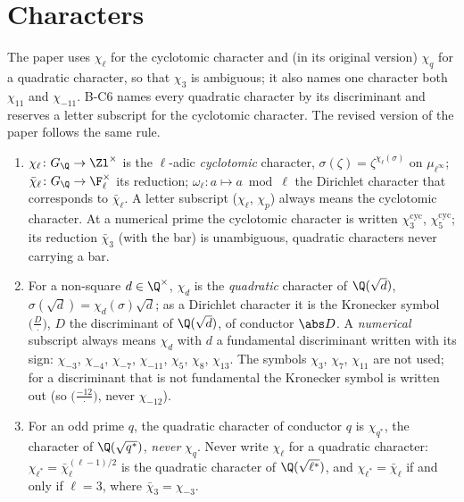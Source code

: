 \section{Characters}\label{sec:notation:characters}

The paper uses $\chi_\ell$ for the cyclotomic character and (in its original version) $\chi_q$ for a quadratic character, so
that $\chi_3$ is ambiguous; it also names one character both $\chi_{11}$ and $\chi_{-11}$. B-C6 names every quadratic character
by its discriminant and reserves a letter subscript for the cyclotomic character. The revised version of the paper follows the
same rule.

\begin{convention}[B-C6: characters]\label{conv:notation:bc6}
\leavevmode
\begin{enumerate}[label=(\alph*)]
\item $\chi_\ell\colon G_\Q\to\Zl^\times$ is the $\ell$-adic \emph{cyclotomic} character, $\sigma(\zeta)=\zeta^{\chi_\ell(\sigma)}$ on
$\mu_{\ell^\infty}$; $\bar\chi_\ell\colon G_\Q\to\F_\ell^\times$ its reduction; $\omega_\ell\colon a\mapsto a\bmod\ell$ the Dirichlet character that
corresponds to $\bar\chi_\ell$. A letter subscript ($\chi_\ell$, $\chi_p$) always means the cyclotomic character. At a numerical prime the
cyclotomic character is written $\chi_3^{\mathrm{cyc}}$, $\chi_5^{\mathrm{cyc}}$; its reduction $\bar\chi_3$ (with the bar) is unambiguous,
quadratic characters never carrying a bar.
\item For a non-square $d\in\Q^\times$, $\chi_d$ is the \emph{quadratic} character of $\Q(\sqrt d)$, $\sigma(\sqrt d)=\chi_d(\sigma)\sqrt d$; as a
Dirichlet character it is the Kronecker symbol $\bigl(\frac D\cdot\bigr)$, $D$ the discriminant of $\Q(\sqrt d)$, of conductor $\abs D$. A
\emph{numerical} subscript always means $\chi_d$ with $d$ a fundamental discriminant written with its sign: $\chi_{-3}$, $\chi_{-4}$,
$\chi_{-7}$, $\chi_{-11}$, $\chi_5$, $\chi_8$, $\chi_{13}$. The symbols $\chi_3$, $\chi_7$, $\chi_{11}$ are not used; for a discriminant that is
not fundamental the Kronecker symbol is written out (so $\bigl(\frac{-12}\cdot\bigr)$, never $\chi_{-12}$).
\item For an odd prime $q$, the quadratic character of conductor $q$ is $\chi_{q^*}$, the character of $\Q(\sqrt{q^*})$, \emph{never}
$\chi_q$. Never write $\chi_\ell$ for a quadratic character: $\chi_{\ell^*}=\bar\chi_\ell^{(\ell-1)/2}$ is the quadratic character of
$\Q(\sqrt{\ell^*})$, and $\chi_{\ell^*}=\bar\chi_\ell$ if and only if $\ell=3$, where $\bar\chi_3=\chi_{-3}$.

\end{enumerate}
\end{convention}
